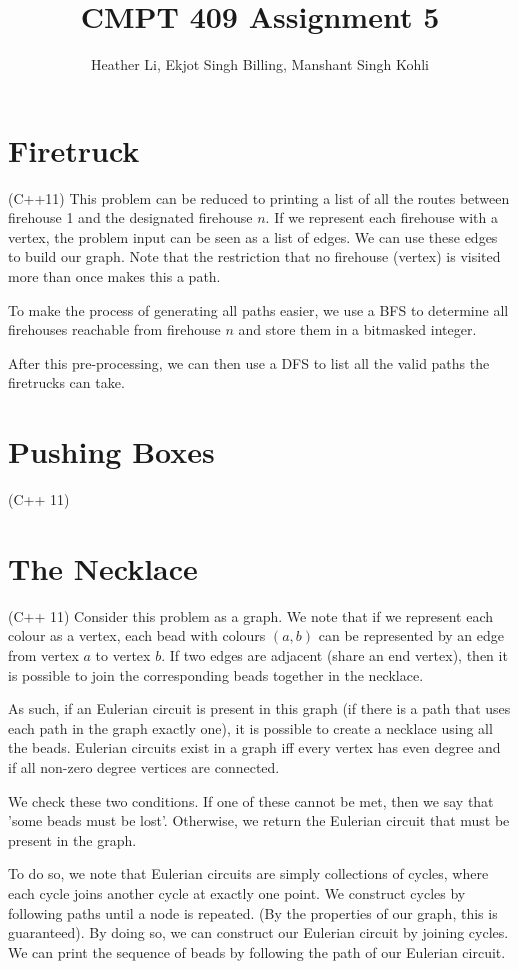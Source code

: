\documentclass{article}
\title{CMPT 409 Assignment 5}
\author{Heather Li, Ekjot Singh Billing, Manshant Singh Kohli}
\begin{document}
\maketitle

\section{Firetruck}
(C++11) 
This problem can be reduced to printing a list of all the routes between firehouse 1 and the designated firehouse $n$. If we represent each firehouse with a vertex, the problem input can be seen as a list of edges. We can use these edges to build our graph. Note that the restriction that no firehouse (vertex) is visited more than once makes this a path.
\par 
To make the process of generating all paths easier, we use a BFS to determine all firehouses reachable from firehouse $n$ and store them in a bitmasked integer.
\par 
After this pre-processing, we can then use a DFS to list all the valid paths the firetrucks can take.

\section{Pushing Boxes}
(C++ 11) 



\section{The Necklace}
(C++ 11) Consider this problem as a graph. We note that if we represent each colour as a vertex, each bead with colours $(a,b)$ can be represented by an edge from vertex $a$ to vertex $b$. If two edges are adjacent (share an end vertex), then it is possible to join the corresponding beads together in the necklace. 
\par
As such, if an Eulerian circuit is present in this graph (if there is a path that uses each path in the graph exactly one), it is possible to create a necklace using all the beads. Eulerian circuits exist in a graph iff every vertex has even degree and if all non-zero degree vertices are connected. 
\par
We check these two conditions. If one of these cannot be met, then we say that 'some beads must be lost'. Otherwise, we return the Eulerian circuit that must be present in the graph.
\par 
To do so, we note that Eulerian circuits are simply collections of cycles, where each cycle joins another cycle at exactly one point. We construct cycles by following paths until a node is repeated. (By the properties of our graph, this is guaranteed). By doing so, we can construct our Eulerian circuit by joining cycles. We can print the sequence of beads by following the path of our Eulerian circuit.
\end{document}
